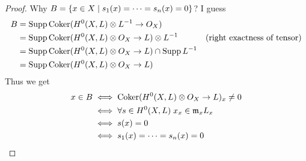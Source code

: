 \begin{proof}
  Why $B = \left\{ x \in X \mathrel{} \middle| \mathrel{} s_1(x) = \cdots = s_n(x) = 0 \right\}$? I guess
  \begin{align*}
    B &= \operatorname{Supp} \operatorname{Coker}(H^0(X,L) \otimes L^{-1} \to O_X) \\
    &= \operatorname{Supp} \operatorname{Coker}(H^0(X,L) \otimes O_X \to L) \otimes L^{-1}  &(\text{right exactness of tensor}) \\
    &= \operatorname{Supp} \operatorname{Coker}(H^0(X,L) \otimes O_X \to L) \cap \operatorname{Supp} L^{-1} \\
    &= \operatorname{Supp} \operatorname{Coker}(H^0(X,L) \otimes O_X \to L)
  \end{align*}
  Thus we get
  \begin{align*}
    x \in B &\iff \operatorname{Coker}(H^0(X,L) \otimes O_X \to L)_x \neq 0 \\
    &\iff \forall s \in H^0(X,L) \; x_x \in \mathfrak{m}_x L_x \\
    &\iff s(x) = 0 \\
    &\iff s_1(x) = \cdots = s_n(x) = 0
   \end{align*}
\end{proof}
